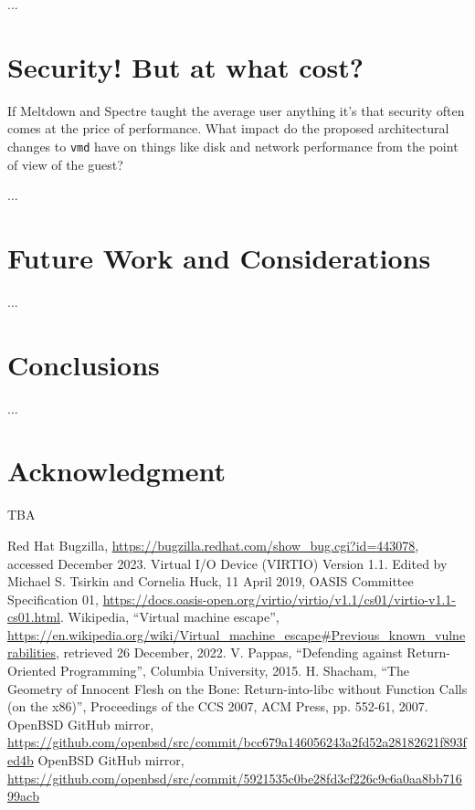 \documentclass[conference]{IEEEtran}
\begin{document}
...

\section{Security! But at what cost?}
If Meltdown and Spectre taught the average user anything it's that
security often comes at the price of performance. What impact do the
proposed architectural changes to \texttt{vmd} have on things like
disk and network performance from the point of view of the guest?

...

\section{Future Work and Considerations}

...

\section{Conclusions}

...

\section*{Acknowledgment}

TBA

\begin{thebibliography}{00}
 Red Hat Bugzilla, \url{https://bugzilla.redhat.com/show_bug.cgi?id=443078}, accessed December 2023.
 Virtual I/O Device (VIRTIO) Version 1.1. Edited by Michael S. Tsirkin and Cornelia Huck, 11 April 2019, OASIS Committee Specification 01, \url{https://docs.oasis-open.org/virtio/virtio/v1.1/cs01/virtio-v1.1-cs01.html}.
 Wikipedia, ``Virtual machine escape'', \url{https://en.wikipedia.org/wiki/Virtual_machine_escape#Previous_known_vulnerabilities}, retrieved 26 December, 2022.
   V. Pappas, ``Defending against Return-Oriented Programming'', Columbia University, 2015.
 H. Shacham, ``The Geometry of Innocent Flesh on the Bone:
  Return-into-libc without Function Calls (on the x86)'', Proceedings of the CCS 2007, ACM Press, pp. 552-61, 2007.
 OpenBSD GitHub mirror, \url{https://github.com/openbsd/src/commit/bcc679a146056243a2fd52a28182621f893fed4b}
 OpenBSD GitHub mirror, \url{https://github.com/openbsd/src/commit/5921535c0be28fd3cf226c9c6a0aa8bb71699acb}
\end{thebibliography}
\end{document}
